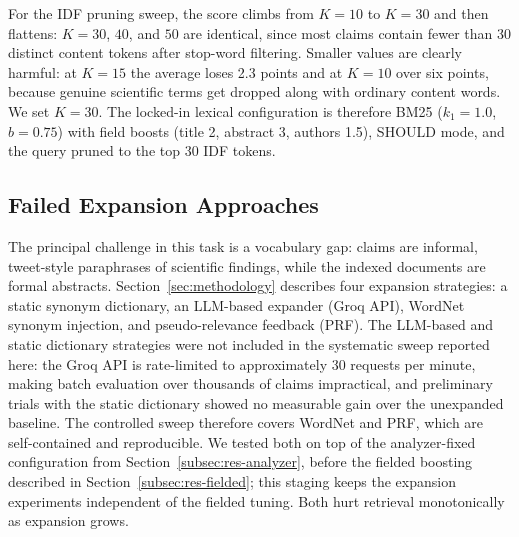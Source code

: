 For the IDF pruning sweep, the score climbs from $K{=}10$ to $K{=}30$ and then flattens: $K{=}30$, $40$, and $50$ are identical, since most claims contain fewer than 30 distinct content tokens after stop-word filtering. Smaller values are clearly harmful: at $K{=}15$ the average loses 2.3 points and at $K{=}10$ over six points, because genuine scientific terms get dropped along with ordinary content words. We set $K{=}30$. The locked-in lexical configuration is therefore BM25 ($k_1{=}1.0$, $b{=}0.75$) with field boosts (title 2, abstract 3, authors 1.5), SHOULD mode, and the query pruned to the top 30 IDF tokens.

\subsection{Failed Expansion Approaches}
\label{subsec:res-expansion}

The principal challenge in this task is a vocabulary gap: claims are informal, tweet-style paraphrases of scientific findings, while the indexed documents are formal abstracts. Section~\ref{sec:methodology} describes four expansion strategies: a static synonym dictionary, an LLM-based expander (Groq API), WordNet synonym injection, and pseudo-relevance feedback (PRF). The LLM-based and static dictionary strategies were not included in the systematic sweep reported here: the Groq API is rate-limited to approximately 30 requests per minute, making batch evaluation over thousands of claims impractical, and preliminary trials with the static dictionary showed no measurable gain over the unexpanded baseline. The controlled sweep therefore covers WordNet and PRF, which are self-contained and reproducible. We tested both on top of the analyzer-fixed configuration from Section~\ref{subsec:res-analyzer}, before the fielded boosting described in Section~\ref{subsec:res-fielded}; this staging keeps the expansion experiments independent of the fielded tuning. Both hurt retrieval monotonically as expansion grows.

